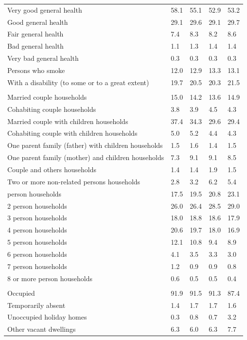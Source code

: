 \documentclass{article}
\begin{document}
\begin{table}[h]
\begin{tabular}{KTTTT}
    \hline
Very good general health & 58.1& 55.1&52.9& 53.2\\
Good general health & 29.1& 29.6& 29.1& 29.7\\
Fair general health & 7.4& 8.3&8.2& 8.6\\
Bad general health & 1.1& 1.3&1.4& 1.4\\
Very bad general health & 0.3& 0.3&0.3& 0.3\\
    \hline
Persons who smoke & 12.0& 12.9&13.3& 13.1\\
    \hline
With a disability (to some or to a great extent) & 19.7& 20.5&20.3& 21.5\\
\hline
    \\ 
    \hline
Married couple households & 15.0& 14.2& 13.6& 14.9\\
Cohabiting couple households & 3.8& 3.9& 4.5& 4.3\\
Married couple with children households & 37.4& 34.3& 29.6& 29.4\\
Cohabiting couple with children households & 5.0& 5.2& 4.4& 4.3\\
One parent family (father) with  children households & 1.5& 1.6& 1.4& 1.5\\
One parent family (mother) and children households & 7.3& 9.1& 9.1& 8.5\\
Couple and others households  & 1.4& 1.4& 1.9& 1.5\\
Two or more non-related persons households & 2.8& 3.2& 6.2& 5.4\\
     person households & 17.5& 19.5& 20.8& 23.1\\
2 person households & 26.0& 26.4& 28.5& 29.0\\
3 person households & 18.0& 18.8& 18.6& 17.9\\
4 person households & 20.6& 19.7& 18.0& 16.9\\
5 person households & 12.1& 10.8&  9.4&  8.9\\
6 person households & 4.1& 3.5& 3.3& 3.0\\
7 person households & 1.2& 0.9& 0.9& 0.8\\
8 or more person households & 0.6& 0.5& 0.5& 0.4\\
\hline
    \\ 
    \hline
Occupied & 91.9& 91.5& 91.3& 87.4\\
Temporarily absent & 1.4& 1.7& 1.7& 1.6\\
Unoccupied holiday homes & 0.3& 0.8& 0.7& 3.2\\
Other vacant dwellings & 6.3& 6.0& 6.3& 7.7\\
\hline
\end{tabular}
\end{table}
\end{document}
